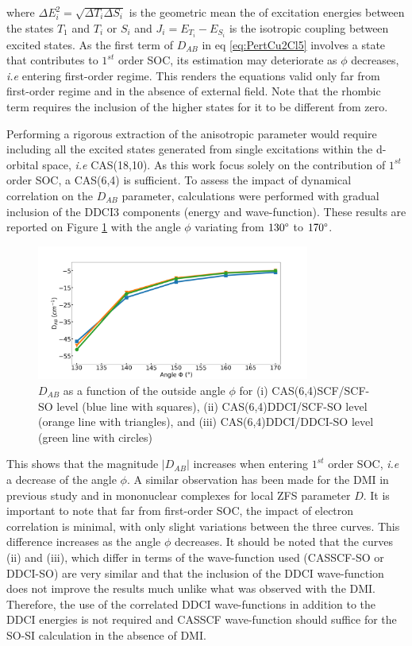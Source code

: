 \documentclass[12pt]{report}
\numberwithin{equation}{section}
\begin{document}
where $\Delta E^2_i=\sqrt{\Delta T_i \Delta S_i}$ is the geometric mean the of excitation energies between the states $T_1$ and $T_i$ or $S_i$ and $J_i=E_{T_i}-E_{S_i}$ is the isotropic coupling between excited states.
As the first term of $D_{AB}$ in eq \ref{eq:PertCu2Cl5} involves a state that contributes to $1^{st}$ order SOC, its estimation may deteriorate as $\phi$ decreases, \textit{i.e} entering first-order regime.
This renders the equations valid only far from first-order regime and in the absence of external field. Note that the rhombic term requires the inclusion of the higher states for it to be different from zero.

Performing a rigorous extraction of the anisotropic parameter would require including all the excited states generated from single excitations within the d-orbital space, \textit{i.e} CAS(18,10).
As this work focus solely on the contribution of $1^{st}$ order SOC, a CAS(6,4) is sufficient. 
To assess the impact of dynamical correlation on the $D_{AB}$ parameter, calculations were performed with gradual inclusion of the DDCI3 components (energy and wave-function).
These results are reported on Figure \ref{DABangle} with the angle $\phi$ variating from $130\degree$ to $170\degree$.

\begin{figure}[!ht]
    \centering
    \includegraphics[width=0.8\textwidth]{Images/D_AB_Angle2.png}
    \caption{$D_{AB}$ as a function of the outside angle $\phi$ for (i) CAS(6,4)SCF/SCF-SO level (blue line with squares), (ii) CAS(6,4)DDCI/SCF-SO level (orange line with triangles), and (iii) CAS(6,4)DDCI/DDCI-SO level (green line with circles) }
    \label{DABangle}
\end{figure}

This shows that the magnitude $|D_{AB}|$ increases when entering $1^{st}$ order SOC, \textit{i.e} a decrease of the angle $\phi$.
A similar observation has been made for the DMI in previous study and in mononuclear complexes for local ZFS parameter $D$.
It is important to note that far from first-order SOC, the impact of electron correlation is minimal, with only slight variations between the three curves.
This difference increases as the angle $\phi$ decreases.
It should be noted that the curves (ii) and (iii), which differ in terms of the wave-function used (CASSCF-SO or DDCI-SO) are very similar and that the inclusion of the DDCI wave-function does not improve the results much unlike what was observed with the DMI.
Therefore, the use of the correlated DDCI wave-functions in addition to the DDCI energies is not required and CASSCF wave-function should suffice for the SO-SI calculation in the absence of DMI. 
\end{document}
